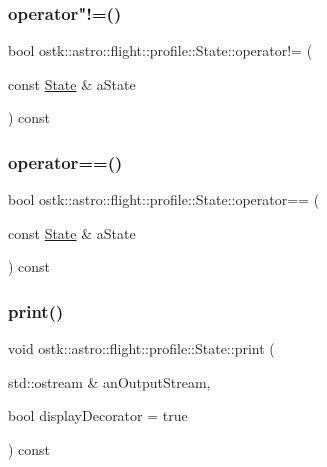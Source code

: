 \subsubsection{\texorpdfstring{operator"!=()}{operator!=()}}
{\footnotesize\ttfamily bool ostk\+::astro\+::flight\+::profile\+::\+State\+::operator!= (\begin{DoxyParamCaption}\item[{const \hyperlink{classostk_1_1astro_1_1flight_1_1profile_1_1_state}{State} \&}]{a\+State }\end{DoxyParamCaption}) const}

\mbox{\label{classostk_1_1astro_1_1flight_1_1profile_1_1_state_a4f6023c3c1d9590ec701bf10b0724ebf}} 
\subsubsection{\texorpdfstring{operator==()}{operator==()}}
{\footnotesize\ttfamily bool ostk\+::astro\+::flight\+::profile\+::\+State\+::operator== (\begin{DoxyParamCaption}\item[{const \hyperlink{classostk_1_1astro_1_1flight_1_1profile_1_1_state}{State} \&}]{a\+State }\end{DoxyParamCaption}) const}

\mbox{\label{classostk_1_1astro_1_1flight_1_1profile_1_1_state_afc8060bca36e76f1b3b7f2ab8ad6df16}} 
\subsubsection{\texorpdfstring{print()}{print()}}
{\footnotesize\ttfamily void ostk\+::astro\+::flight\+::profile\+::\+State\+::print (\begin{DoxyParamCaption}\item[{std\+::ostream \&}]{an\+Output\+Stream,  }\item[{bool}]{display\+Decorator = {\ttfamily true} }\end{DoxyParamCaption}) const}

